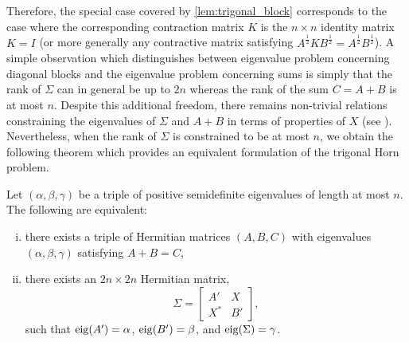 \documentclass[notitlepage, 10pt]{article}
\begin{document}
Therefore, the special case covered by \cref{lem:trigonal_block} corresponds to the case where the corresponding contraction matrix $K$ is the $n\times n$ identity matrix $K=I$ (or more generally any contractive matrix satisfying $A^{\frac{1}{2}} K B^{\frac{1}{2}} = A^{\frac{1}{2}} B^{\frac{1}{2}}$).
A simple observation which distinguishes between eigenvalue problem concerning diagonal blocks and the eigenvalue problem concerning sums is simply that the rank of $\Sigma$ can in general be up to $2n$ whereas the rank of the sum $C = A+B$ is at most $n$.
Despite this additional freedom, there remains non-trivial relations constraining the eigenvalues of $\Sigma$ and $A+B$ in terms of properties of $X$ (see \cite{gumus2018positive,bourin2022eigenvalue}).
Nevertheless, when the rank of $\Sigma$ is constrained to be at most $n$, we obtain the following theorem which provides an equivalent formulation of the trigonal Horn problem.
\begin{thm}
    \label{thm:trigonal_block}
    Let $(\alpha,\beta,\gamma)$ be a triple of positive semidefinite eigenvalues of length at most $n$.
    The following are equivalent:
    \begin{enumerate}[(i)]
        \item there exists a triple of Hermitian matrices $(A,B,C)$ with eigenvalues $(\alpha,\beta,\gamma)$ satisfying $A+B=C$,
        \item there exists an $2n \times 2n$ Hermitian matrix,
            \begin{equation}
                \Sigma = \begin{bmatrix}
                    A' & X \\
                    X^{*} & B'
                \end{bmatrix},
            \end{equation}
            such that $\operatorname{eig}(A') = \alpha$, $\operatorname{eig}(B') = \beta$, and $\operatorname{eig}(\Sigma) = \gamma$.
    \end{enumerate}
\end{thm}
\end{document}
